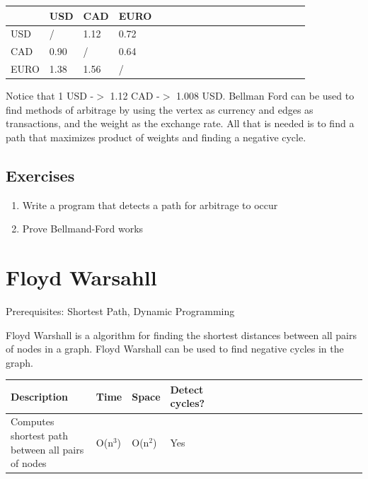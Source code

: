 \documentclass[11pt,oneside]{book}
\begin{document}
\vspace{10px}\begin{tabulary}{0.4\linewidth}{|l|l|l|l|l|l|l|l|l|l|l|l|l|l|l|l|l|l|l}\hline


   &
  USD &
  CAD &
  EURO\\
\hline


  USD &
  / &
  1.12 &
  0.72\\

  CAD &
  0.90 &
  / &
  0.64\\

  EURO &
  1.38 &
  1.56 &
  /\\

\hline\end{tabulary}

Notice that 1 USD -$>$ 1.12 CAD -$>$ 1.008 USD. Bellman Ford can be used to find methods of arbitrage by using the vertex as currency and edges as transactions, and the weight as the exchange rate. All that is needed is to find a path that maximizes product of weights and finding a negative cycle.

\subsection{Exercises}

\begin{enumerate}
\item Write a program that detects a path for arbitrage to occur
\item Prove Bellmand-Ford works
\end{enumerate}

        \section{ Floyd Warsahll }
        

Prerequisites:  Shortest Path, Dynamic Programming

Floyd Warshall is a algorithm for finding the shortest distances between all pairs of nodes in a graph. Floyd Warshall can be used to find negative cycles in the graph.

\vspace{10px}\begin{tabulary}{0.4\linewidth}{|l|l|l|l|l|l|l|l|l|l|l|l|l|l|l|l|l|l|l}\hline


  Description &
  Time &
  Space &
  Detect cycles?\\
\hline


  Computes shortest path between all pairs of nodes &
  O(n$^{3}$) &
  O(n$^{2}$) &
  Yes\\

\hline\end{tabulary}
\end{document}
